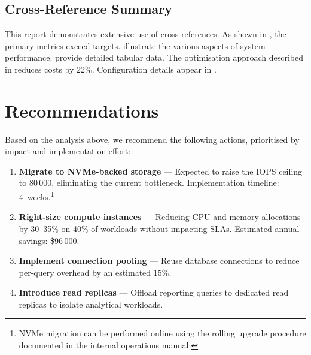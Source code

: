 \documentclass[
    language=english,
    doctype=technical-report,
    institution=none,
    titlestyle=book,
    oneside,
    loadGlossaries,
]{../../omnilatex}
\begin{document}
\section{Cross-Reference Summary}

This report demonstrates extensive use of cross-references. As shown in
, the primary metrics exceed targets.
illustrate the various aspects of system performance.
provide detailed tabular data. The optimisation approach described in
 reduces costs by 22\%. Configuration details appear
in .

\chapter{Recommendations}
\label{sec:recommendations}

Based on the analysis above, we recommend the following actions,
prioritised by impact and implementation effort:

\begin{enumerate}
    \item \textbf{Migrate to NVMe-backed storage} --- Expected to raise
        the IOPS ceiling to 80\,000, eliminating the current bottleneck.
        Implementation timeline: 4~weeks.\footnote{NVMe migration can
        be performed online using the rolling upgrade procedure documented
        in the internal operations manual.}
    \item \textbf{Right-size compute instances} --- Reducing CPU and
        memory allocations by 30--35\% on 40\% of workloads without
        impacting SLAs. Estimated annual savings: \$96\,000.
    \item \textbf{Implement connection pooling} --- Reuse database
        connections to reduce per-query overhead by an estimated 15\%.
    \item \textbf{Introduce read replicas} --- Offload reporting queries
        to dedicated read replicas to isolate analytical workloads.
\end{enumerate}
\end{document}
